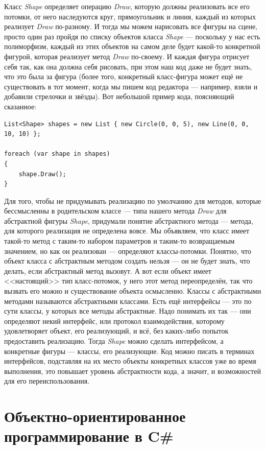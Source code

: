 \documentclass[a5paper]{article}
\begin{document}
Класс \textit{Shape} определяет операцию \textit{Draw}, которую должны реализовать все его потомки, от него наследуются круг, прямоугольник и линия, каждый из которых реализует \textit{Draw} по-разному. И тогда мы можем нарисовать все фигуры на сцене, просто один раз пройдя по списку объектов класса \textit{Shape} --- поскольку у нас есть полиморфизм, каждый из этих объектов на самом деле будет какой-то конкретной фигурой, которая реализует метод \textit{Draw} по-своему. И каждая фигура отрисует себя так, как она должна себя рисовать, при этом наш код даже не будет знать, что это была за фигура (более того, конкретный класс-фигура может ещё не существовать в тот момент, когда мы пишем код редактора --- например, взяли и добавили стрелочки и звёзды). Вот небольшой пример кода, поясняющий сказанное:

\begin{verbatim}
List<Shape> shapes = new List { new Circle(0, 0, 5), new Line(0, 0, 10, 10) };

foreach (var shape in shapes)
{
    shape.Draw();
}
\end{verbatim}

Для того, чтобы не придумывать реализацию по умолчанию для методов, которые бессмысленны в родительском классе --- типа нашего метода \textit{Draw} для абстрактной фигуры \textit{Shape}, придумали понятие абстрактного метода --- метода, для которого реализация не определена вовсе. Мы объявляем, что класс имеет такой-то метод с таким-то набором параметров и таким-то возвращаемым значением, но как он реализован --- определяют классы-потомки. Понятно, что объект класса с абстрактным методом создать нельзя --- он не будет знать, что делать, если абстрактный метод вызовут. А вот если объект имеет <<настоящий>> тип класс-потомок, у него этот метод переопределён, так что вызвать его можно и существование объекта осмысленно. Классы с абстрактными методами называются абстрактными классами. Есть ещё интерфейсы --- это по сути классы, у которых все методы абстрактные. Надо понимать их так --- они определяют некий интерфейс, или протокол взаимодействия, которому удовлетворяет объект, его реализующий, и всё, без каких-либо попыток предоставить реализацию. Тогда \textit{Shape} можно сделать интерфейсом, а конкретные фигуры --- классы, его реализующие. Код можно писать в терминах интерфейсов, подставляя на их место объекты конкретных классов уже во время выполнения, это повышает уровень абстрактности кода, а значит, и возможностей для его переиспользования.

\section{Объектно-ориентированное программирование в C\#}
\end{document}
